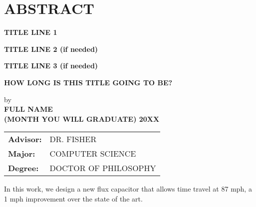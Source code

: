 \section*{ABSTRACT}

\centerline{\bf TITLE LINE 1}
\vspace{-0.4cm}
\centerline{\bf TITLE LINE 2 (if needed)}
\vspace{-0.4cm}
\centerline{\bf TITLE LINE 3 (if needed)}
\vspace{-0.4cm}
\centerline{\bf HOW LONG IS THIS TITLE GOING TO BE?}

{\setlength\baselineskip{0.3in}
\begin{center}
by\\
\medskip
{\bf FULL NAME}\\
\medskip
{\bf (MONTH YOU WILL GRADUATE) 20XX}\\
\end{center}
\Vspc
\begin{tabular}{ll}
	{\bf Advisor:} & DR. FISHER \\
	{\bf Major:} & COMPUTER SCIENCE \\
	{\bf Degree:} & DOCTOR OF PHILOSOPHY
\end{tabular}
}

\bigskip \bigskip

In this work, we design a new flux capacitor that allows time travel at 87 mph, a 1 mph improvement over the state of the art.